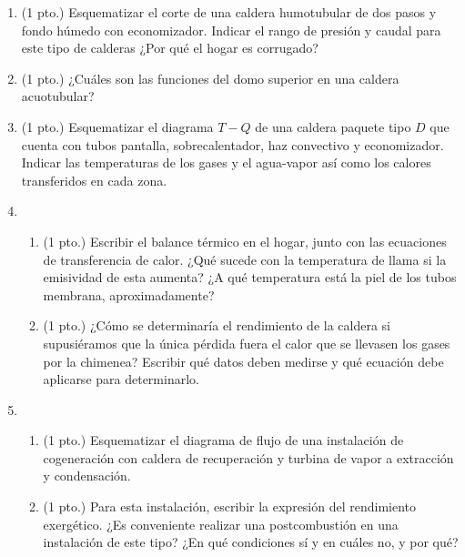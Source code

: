 \documentclass[10pt,a4paper]{article}
\begin{document}
\begin{enumerate}

        \item (1 pto.) Esquematizar el corte de una caldera humotubular de dos pasos y fondo húmedo con economizador. Indicar el rango de presión y caudal para este tipo de calderas ¿Por qué el hogar es corrugado?

        \item (1 pto.) ¿Cuáles son las funciones del domo superior en una caldera acuotubular? 
        
        \item (1 pto.) Esquematizar el diagrama $T-Q$ de una caldera paquete tipo $D$ que cuenta con tubos pantalla, sobrecalentador, haz convectivo y economizador. Indicar las temperaturas de los gases y el agua-vapor así como los calores transferidos en cada zona. 

        \item \begin{enumerate}

             \item (1 pto.) Escribir el balance térmico en el hogar, junto con las ecuaciones de transferencia de calor. ¿Qué sucede con la temperatura de llama si la emisividad de esta aumenta? ¿A qué temperatura está la piel de los tubos membrana, aproximadamente?

             \item (1 pto.) ¿Cómo se determinaría el rendimiento de la caldera si supusiéramos que la única pérdida fuera el calor que se llevasen los gases por la chimenea? Escribir qué datos deben medirse y qué ecuación debe aplicarse para determinarlo.
        
        \end{enumerate}
   
         \item \begin{enumerate}
              \item (1 pto.) Esquematizar el diagrama de flujo de una instalación de cogeneración con caldera de recuperación y turbina de vapor a extracción y condensación.

               \item (1 pto.) Para esta instalación, escribir la expresión del rendimiento exergético. ¿Es conveniente realizar una postcombustión en una instalación de este tipo? ¿En qué condiciones sí y en cuáles no, y por qué?
         \end{enumerate}
      

\end{enumerate}
\end{document}
